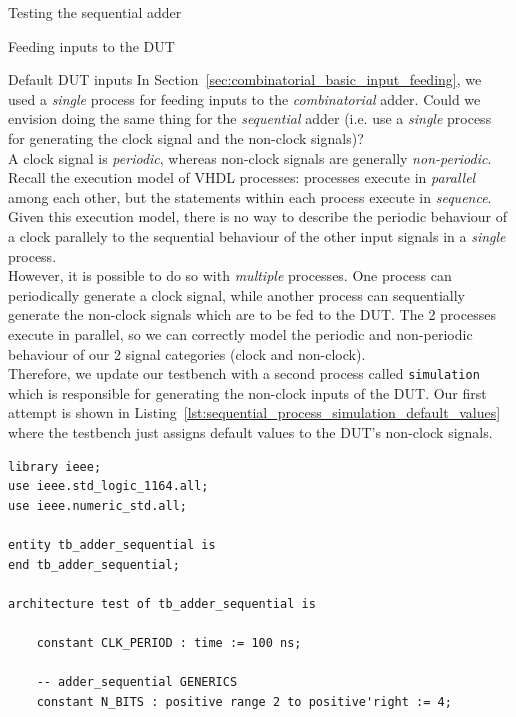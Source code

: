 \documentclass[lab]{course}
\begin{document}
\begin{section}{Testing the sequential adder}
\begin{subsection}{Feeding inputs to the DUT}
        \begin{subsubsection}{Default DUT inputs}
            In Section~\ref{sec:combinatorial_basic_input_feeding}, we used a \emph{single} process for feeding inputs to the \emph{combinatorial} adder. Could we envision doing the same thing for the \emph{sequential} adder (i.e. use a \emph{single} process for generating the clock signal and the non-clock signals)? \\

            A clock signal is \emph{periodic}, whereas non-clock signals are generally \emph{non-periodic}. Recall the execution model of VHDL processes: processes execute in \emph{parallel} among each other, but the statements within each process execute in \emph{sequence}. Given this execution model, there is no way to describe the periodic behaviour of a clock parallely to the sequential behaviour of the other input signals in a \emph{single} process. \\

            However, it is possible to do so with \emph{multiple} processes. One process can periodically generate a clock signal, while another process can sequentially generate the non-clock signals which are to be fed to the DUT. The 2 processes execute in parallel, so we can correctly model the periodic and non-periodic behaviour of our 2 signal categories (clock and non-clock). \\

            Therefore, we update our testbench with a second process called \verb+simulation+ which is responsible for generating the non-clock inputs of the DUT. Our first attempt is shown in Listing~\ref{lst:sequential_process_simulation_default_values} where the testbench just assigns default values to the DUT's non-clock signals.

            \begin{lstlisting}[caption={Add \texttt{simulation} process for generating non-clock signals to the DUT. This first version only assigns default values to the non-clock signals.}, captionpos=b, label={lst:sequential_process_simulation_default_values}]
library ieee;
use ieee.std_logic_1164.all;
use ieee.numeric_std.all;

entity tb_adder_sequential is
end tb_adder_sequential;

architecture test of tb_adder_sequential is

    constant CLK_PERIOD : time := 100 ns;

    -- adder_sequential GENERICS
    constant N_BITS : positive range 2 to positive'right := 4;


\end{lstlisting}
\end{subsubsection}
\end{subsection}
\end{section}
\end{document}
